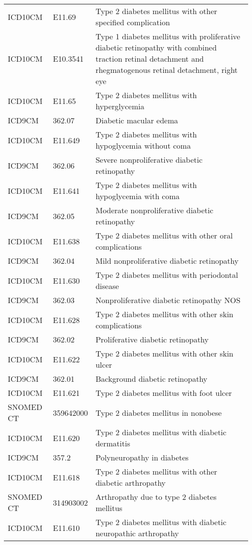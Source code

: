 \begin{table}[ht]
\begin{tabular}{lll}
  ICD10CM & E11.69 & Type 2 diabetes mellitus with other specified complication \\ 
  ICD10CM & E10.3541 & Type 1 diabetes mellitus with proliferative diabetic retinopathy with combined traction retinal detachment and rhegmatogenous retinal detachment, right eye \\ 
  ICD10CM & E11.65 & Type 2 diabetes mellitus with hyperglycemia \\ 
  ICD9CM & 362.07 & Diabetic macular edema \\ 
  ICD10CM & E11.649 & Type 2 diabetes mellitus with hypoglycemia without coma \\ 
  ICD9CM & 362.06 & Severe nonproliferative diabetic retinopathy \\ 
  ICD10CM & E11.641 & Type 2 diabetes mellitus with hypoglycemia with coma \\ 
  ICD9CM & 362.05 & Moderate nonproliferative diabetic retinopathy \\ 
  ICD10CM & E11.638 & Type 2 diabetes mellitus with other oral complications \\ 
  ICD9CM & 362.04 & Mild nonproliferative diabetic retinopathy \\ 
  ICD10CM & E11.630 & Type 2 diabetes mellitus with periodontal disease \\ 
  ICD9CM & 362.03 & Nonproliferative diabetic retinopathy NOS \\ 
  ICD10CM & E11.628 & Type 2 diabetes mellitus with other skin complications \\ 
  ICD9CM & 362.02 & Proliferative diabetic retinopathy \\ 
  ICD10CM & E11.622 & Type 2 diabetes mellitus with other skin ulcer \\ 
  ICD9CM & 362.01 & Background diabetic retinopathy \\ 
  ICD10CM & E11.621 & Type 2 diabetes mellitus with foot ulcer \\ 
  SNOMED CT & 359642000 & Type 2 diabetes mellitus in nonobese \\ 
  ICD10CM & E11.620 & Type 2 diabetes mellitus with diabetic dermatitis \\ 
  ICD9CM & 357.2 & Polyneuropathy in diabetes \\ 
  ICD10CM & E11.618 & Type 2 diabetes mellitus with other diabetic arthropathy \\ 
  SNOMED CT & 314903002 & Arthropathy due to type 2 diabetes mellitus \\ 
  ICD10CM & E11.610 & Type 2 diabetes mellitus with diabetic neuropathic arthropathy \\ 

\end{tabular}
\end{table}

